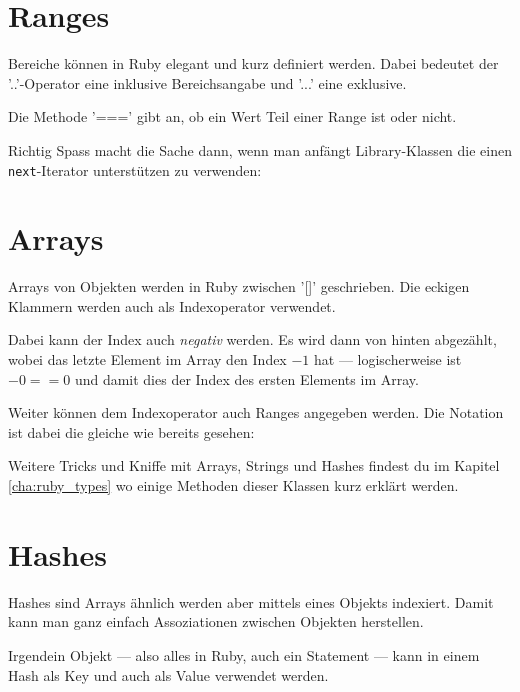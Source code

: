 \documentclass[a4book,11pt,twoside]{scrbook}
\begin{document}
\section{Ranges}
Bereiche können in Ruby elegant und kurz definiert werden. Dabei bedeutet der '..'-Operator eine inklusive Bereichsangabe und '...' eine exklusive.

Die Methode '===' gibt an, ob ein Wert Teil einer Range ist oder nicht.




Richtig Spass macht die Sache dann, wenn man anfängt Library-Klassen die einen \texttt{next}-Iterator unterstützen zu verwenden:







\section{Arrays} %
\label{sec:arrays}
Arrays von Objekten werden in Ruby zwischen '[]' geschrieben. Die eckigen Klammern werden auch als Indexoperator verwendet.

Dabei kann der Index auch \emph{negativ} werden. Es wird dann von hinten abgezählt, wobei das letzte Element im Array den Index $-1$ hat — logischerweise ist $-0 == 0$ und damit dies der Index des ersten Elements im Array.





Weiter können dem Indexoperator auch Ranges angegeben werden. Die Notation ist dabei die gleiche wie bereits gesehen:




Weitere Tricks und Kniffe mit Arrays, Strings und Hashes findest du im Kapitel \ref{cha:ruby_types} wo einige Methoden dieser Klassen kurz erklärt werden.


\section{Hashes} %
\label{sub:hashes}
Hashes sind Arrays ähnlich werden aber mittels eines Objekts indexiert. Damit kann man ganz einfach Assoziationen zwischen Objekten herstellen.

Irgendein Objekt — also alles in Ruby, auch ein Statement — kann in einem Hash als Key und auch als Value verwendet werden.
\end{document}
